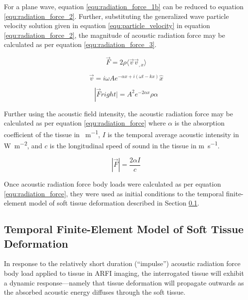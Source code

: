 			For a plane wave, equation \ref{equ:radiation_force_1b} can be reduced to equation \ref{equ:radiation_force_2}. Further, substituting the generalized wave particle velocity solution given in equation \ref{equ:particle_velocity} in equation \ref{equ:radiation_force_2}, the magnitude of acoustic radiation force may be calculated as per equation \ref{equ:radiation_force_3}.

			\begin{equation}
				\label{equ:radiation_force_2}
				\vec{F} = 2\rho\langle \vec{v} \vec{v}_{,x} \rangle
			\end{equation}

			\begin{equation}
				\label{equ:particle_velocity}
				\vec{v} = i\omega A e^{-\alpha x + i\left(\omega t - k x\right)}\hat{x}
			\end{equation}

			\begin{equation}
				\label{equ:radiation_force_3}
				\left|\vec{F}right| = A^2 e^{-2\alpha x}\rho\alpha
			\end{equation}

			Further using the acoustic field intensity, the acoustic radiation force may be calculated as per equation \ref{equ:radiation_force} where $\alpha$ is the absorption coefficient of the tissue in \si{\Np\per\m}, $I$ is the temporal average acoustic intensity in \si{\W\per\m\squared}, and $c$ is the longitudinal speed of sound in the tissue in \si{\m\per\s}.

			\begin{equation}
				\label{equ:radiation_force}
				\left|\vec{F}\right| = \frac{2\alpha I}{c}
			\end{equation}

			Once acoustic radiation force body loads were calculated as per equation \ref{equ:radiation_force}, they were used as initial conditions to the temporal finite-element model of soft tissue deformation described in Section \ref{sec:temporal_fea_arfi}.

		\subsection{Temporal Finite-Element Model of Soft Tissue Deformation}
			\label{sec:temporal_fea_arfi}
			In response to the relatively short duration (``impulse'') acoustic radiation force body load applied to tissue in ARFI imaging, the interrogated tissue will exhibit a dynamic response---namely that tissue deformation will propagate outwards as the absorbed acoustic energy diffuses through the soft tissue.

